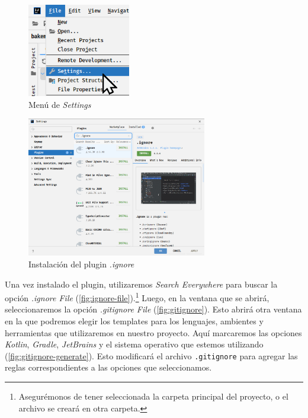   \begin{figure}[ht!]
    \centering
    \includegraphics[width=0.4\textwidth]{img/oop/tdd/gradle/idea64_file_settings.png}
    \caption{Menú de \textit{Settings}}
    \label{fig:settings}
  \end{figure}

  \begin{figure}[ht!]
    \centering
    \includegraphics[width=0.7\textwidth]{img/oop/tdd/gradle/idea64_ignore_plugin.png}
    \caption{Instalación del plugin \textit{.ignore}}
    \label{fig:ignore}
  \end{figure}

  Una vez instalado el plugin, utilizaremos \textit{Search Everywhere} para buscar la opción 
  \textit{.ignore File} (\cref{fig:ignore-file}).\footnote{
    Asegurémonos de tener seleccionada la carpeta principal del proyecto, o el archivo se creará
    en otra carpeta.
  }
  Luego, en la ventana que se abrirá, seleccionaremos la opción \textit{.gitignore File} 
  (\cref{fig:gitignore}).
  Esto abrirá otra ventana en la que podremos elegir los templates para los lenguajes, ambientes y
  herramientas que utilizaremos en nuestro proyecto.
  Aquí marcaremos las opciones \textit{Kotlin}, \textit{Gradle}, \textit{JetBrains} y el sistema
  operativo que estemos utilizando (\cref{fig:gitignore-generate}).
  Esto modificará el archivo \texttt{.gitignore} para agregar las reglas correspondientes a las 
  opciones que seleccionamos.


